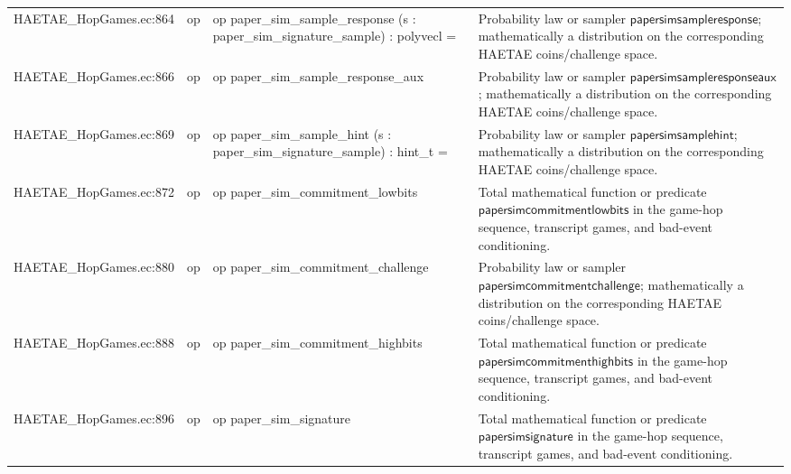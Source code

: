 \documentclass[10pt]{article}
\begin{document}
\begin{longtable}{L{0.11\textwidth}L{0.055\textwidth}L{0.385\textwidth}L{0.41\textwidth}}
HAETAE\_\allowbreak{}HopGames.\allowbreak{}ec:\allowbreak{}864 & op & {\ttfamily\scriptsize op paper\_\allowbreak{}sim\_\allowbreak{}sample\_\allowbreak{}response (s : paper\_\allowbreak{}sim\_\allowbreak{}signature\_\allowbreak{}sample) : polyvecl =} & Probability law or sampler $\mathsf{papersimsampleresponse}$; mathematically a distribution on the corresponding HAETAE coins/challenge space. \\
HAETAE\_\allowbreak{}HopGames.\allowbreak{}ec:\allowbreak{}866 & op & {\ttfamily\scriptsize op paper\_\allowbreak{}sim\_\allowbreak{}sample\_\allowbreak{}response\_\allowbreak{}aux} & Probability law or sampler $\mathsf{papersimsampleresponseaux}$; mathematically a distribution on the corresponding HAETAE coins/challenge space. \\
HAETAE\_\allowbreak{}HopGames.\allowbreak{}ec:\allowbreak{}869 & op & {\ttfamily\scriptsize op paper\_\allowbreak{}sim\_\allowbreak{}sample\_\allowbreak{}hint (s : paper\_\allowbreak{}sim\_\allowbreak{}signature\_\allowbreak{}sample) : hint\_\allowbreak{}t =} & Probability law or sampler $\mathsf{papersimsamplehint}$; mathematically a distribution on the corresponding HAETAE coins/challenge space. \\
HAETAE\_\allowbreak{}HopGames.\allowbreak{}ec:\allowbreak{}872 & op & {\ttfamily\scriptsize op paper\_\allowbreak{}sim\_\allowbreak{}commitment\_\allowbreak{}lowbits} & Total mathematical function or predicate $\mathsf{papersimcommitmentlowbits}$ in the game-hop sequence, transcript games, and bad-event conditioning. \\
HAETAE\_\allowbreak{}HopGames.\allowbreak{}ec:\allowbreak{}880 & op & {\ttfamily\scriptsize op paper\_\allowbreak{}sim\_\allowbreak{}commitment\_\allowbreak{}challenge} & Probability law or sampler $\mathsf{papersimcommitmentchallenge}$; mathematically a distribution on the corresponding HAETAE coins/challenge space. \\
HAETAE\_\allowbreak{}HopGames.\allowbreak{}ec:\allowbreak{}888 & op & {\ttfamily\scriptsize op paper\_\allowbreak{}sim\_\allowbreak{}commitment\_\allowbreak{}highbits} & Total mathematical function or predicate $\mathsf{papersimcommitmenthighbits}$ in the game-hop sequence, transcript games, and bad-event conditioning. \\
HAETAE\_\allowbreak{}HopGames.\allowbreak{}ec:\allowbreak{}896 & op & {\ttfamily\scriptsize op paper\_\allowbreak{}sim\_\allowbreak{}signature} & Total mathematical function or predicate $\mathsf{papersimsignature}$ in the game-hop sequence, transcript games, and bad-event conditioning. \\

\end{longtable}
\end{document}
